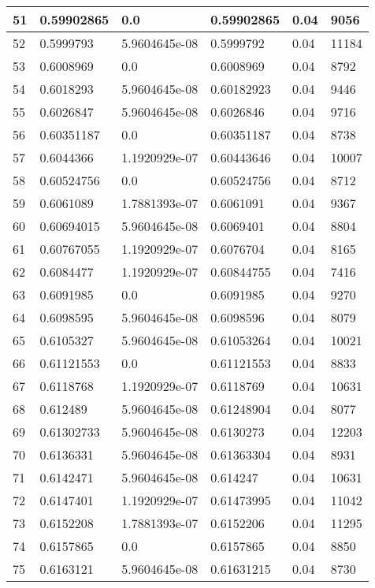 \begin{longtable}{|l|l|l|l|l|l|}
51 & 0.59902865 & 0.0 & 0.59902865 & 0.04 & 9056 \\ \hline 
52 & 0.5999793 & 5.9604645e-08 & 0.5999792 & 0.04 & 11184 \\ \hline 
53 & 0.6008969 & 0.0 & 0.6008969 & 0.04 & 8792 \\ \hline 
54 & 0.6018293 & 5.9604645e-08 & 0.60182923 & 0.04 & 9446 \\ \hline 
55 & 0.6026847 & 5.9604645e-08 & 0.6026846 & 0.04 & 9716 \\ \hline 
56 & 0.60351187 & 0.0 & 0.60351187 & 0.04 & 8738 \\ \hline 
57 & 0.6044366 & 1.1920929e-07 & 0.60443646 & 0.04 & 10007 \\ \hline 
58 & 0.60524756 & 0.0 & 0.60524756 & 0.04 & 8712 \\ \hline 
59 & 0.6061089 & 1.7881393e-07 & 0.6061091 & 0.04 & 9367 \\ \hline 
60 & 0.60694015 & 5.9604645e-08 & 0.6069401 & 0.04 & 8804 \\ \hline 
61 & 0.60767055 & 1.1920929e-07 & 0.6076704 & 0.04 & 8165 \\ \hline 
62 & 0.6084477 & 1.1920929e-07 & 0.60844755 & 0.04 & 7416 \\ \hline 
63 & 0.6091985 & 0.0 & 0.6091985 & 0.04 & 9270 \\ \hline 
64 & 0.6098595 & 5.9604645e-08 & 0.6098596 & 0.04 & 8079 \\ \hline 
65 & 0.6105327 & 5.9604645e-08 & 0.61053264 & 0.04 & 10021 \\ \hline 
66 & 0.61121553 & 0.0 & 0.61121553 & 0.04 & 8833 \\ \hline 
67 & 0.6118768 & 1.1920929e-07 & 0.6118769 & 0.04 & 10631 \\ \hline 
68 & 0.612489 & 5.9604645e-08 & 0.61248904 & 0.04 & 8077 \\ \hline 
69 & 0.61302733 & 5.9604645e-08 & 0.6130273 & 0.04 & 12203 \\ \hline 
70 & 0.6136331 & 5.9604645e-08 & 0.61363304 & 0.04 & 8931 \\ \hline 
71 & 0.6142471 & 5.9604645e-08 & 0.614247 & 0.04 & 10631 \\ \hline 
72 & 0.6147401 & 1.1920929e-07 & 0.61473995 & 0.04 & 11042 \\ \hline 
73 & 0.6152208 & 1.7881393e-07 & 0.6152206 & 0.04 & 11295 \\ \hline 
74 & 0.6157865 & 0.0 & 0.6157865 & 0.04 & 8850 \\ \hline 
75 & 0.6163121 & 5.9604645e-08 & 0.61631215 & 0.04 & 8730 \\ \hline 
\end{longtable}